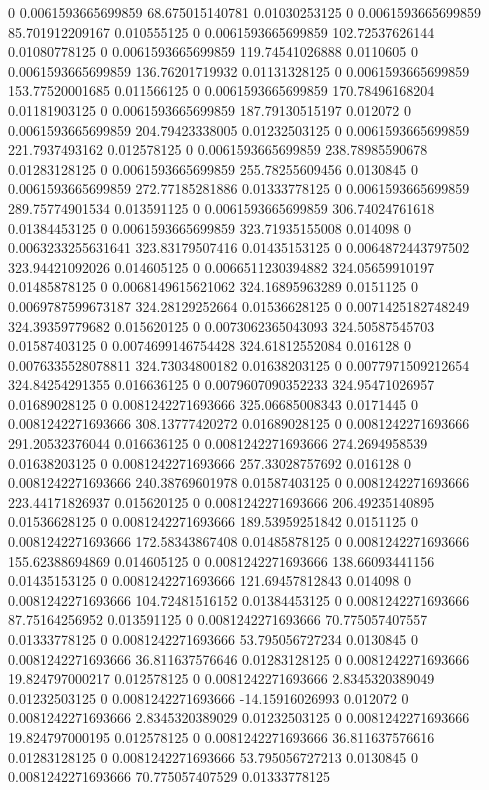 0 0.0061593665699859 68.675015140781 0.01030253125
0 0.0061593665699859 85.701912209167 0.010555125
0 0.0061593665699859 102.72537626144 0.01080778125
0 0.0061593665699859 119.74541026888 0.0110605
0 0.0061593665699859 136.76201719932 0.01131328125
0 0.0061593665699859 153.77520001685 0.011566125
0 0.0061593665699859 170.78496168204 0.01181903125
0 0.0061593665699859 187.79130515197 0.012072
0 0.0061593665699859 204.79423338005 0.01232503125
0 0.0061593665699859 221.7937493162 0.012578125
0 0.0061593665699859 238.78985590678 0.01283128125
0 0.0061593665699859 255.78255609456 0.0130845
0 0.0061593665699859 272.77185281886 0.01333778125
0 0.0061593665699859 289.75774901534 0.013591125
0 0.0061593665699859 306.74024761618 0.01384453125
0 0.0061593665699859 323.71935155008 0.014098
0 0.0063233255631641 323.83179507416 0.01435153125
0 0.0064872443797502 323.94421092026 0.014605125
0 0.0066511230394882 324.05659910197 0.01485878125
0 0.0068149615621062 324.16895963289 0.0151125
0 0.0069787599673187 324.28129252664 0.01536628125
0 0.0071425182748249 324.39359779682 0.015620125
0 0.0073062365043093 324.50587545703 0.01587403125
0 0.0074699146754428 324.61812552084 0.016128
0 0.0076335528078811 324.73034800182 0.01638203125
0 0.0077971509212654 324.84254291355 0.016636125
0 0.0079607090352233 324.95471026957 0.01689028125
0 0.0081242271693666 325.06685008343 0.0171445
0 0.0081242271693666 308.13777420272 0.01689028125
0 0.0081242271693666 291.20532376044 0.016636125
0 0.0081242271693666 274.2694958539 0.01638203125
0 0.0081242271693666 257.33028757692 0.016128
0 0.0081242271693666 240.38769601978 0.01587403125
0 0.0081242271693666 223.44171826937 0.015620125
0 0.0081242271693666 206.49235140895 0.01536628125
0 0.0081242271693666 189.53959251842 0.0151125
0 0.0081242271693666 172.58343867408 0.01485878125
0 0.0081242271693666 155.62388694869 0.014605125
0 0.0081242271693666 138.66093441156 0.01435153125
0 0.0081242271693666 121.69457812843 0.014098
0 0.0081242271693666 104.72481516152 0.01384453125
0 0.0081242271693666 87.75164256952 0.013591125
0 0.0081242271693666 70.775057407557 0.01333778125
0 0.0081242271693666 53.795056727234 0.0130845
0 0.0081242271693666 36.811637576646 0.01283128125
0 0.0081242271693666 19.824797000217 0.012578125
0 0.0081242271693666 2.8345320389049 0.01232503125
0 0.0081242271693666 -14.15916026993 0.012072
0 0.0081242271693666 2.8345320389029 0.01232503125
0 0.0081242271693666 19.824797000195 0.012578125
0 0.0081242271693666 36.811637576616 0.01283128125
0 0.0081242271693666 53.795056727213 0.0130845
0 0.0081242271693666 70.775057407529 0.01333778125
